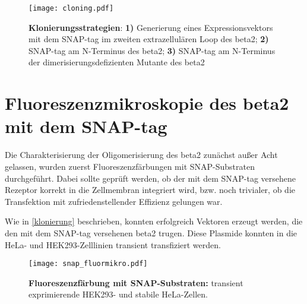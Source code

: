\begin{figure}[htp]
    \texttt{[image: cloning.pdf]}
    \caption{\textbf{Klonierungsstrategien}: \textbf{1)} Generierung eines Expressionsvektors mit dem SNAP-tag im zweiten extrazellulären Loop des \gls{beta2}; \textbf{2)} SNAP-tag am N-Terminus des \gls{beta2}; \textbf{3)} SNAP-tag am N-Terminus der dimerisierungsdefizienten Mutante des \gls{beta2}}
    \label{fig:klonierung}
\end{figure}

\section{Fluoreszenzmikroskopie des \gls{beta2} mit dem SNAP-tag} \label{snapmikro}

Die Charakterisierung der Oligomerisierung des \gls{beta2} zunächst außer Acht gelassen, wurden zuerst Fluoreszenzfärbungen mit SNAP-Substraten durchgeführt. Dabei sollte geprüft werden, ob der mit dem SNAP-tag versehene Rezeptor korrekt in die Zellmembran integriert wird, bzw. noch trivialer, ob die Transfektion mit zufriedenstellender Effizienz gelungen war.

Wie in \ref{klonierung} beschrieben, konnten erfolgreich Vektoren erzeugt werden, die den mit dem SNAP-tag versehenen \gls{beta2} trugen. Diese Plasmide konnten in die HeLa- und HEK293-Zelllinien transient transfiziert werden.

\begin{figure}[htp]
    \texttt{[image: snap\_fluormikro.pdf]}
    \caption{\textbf{Fluoreszenzfärbung mit SNAP-Substraten:} transient exprimierende HEK293- und stabile HeLa-Zellen.}
    \label{fig:stainsnap}
\end{figure}

